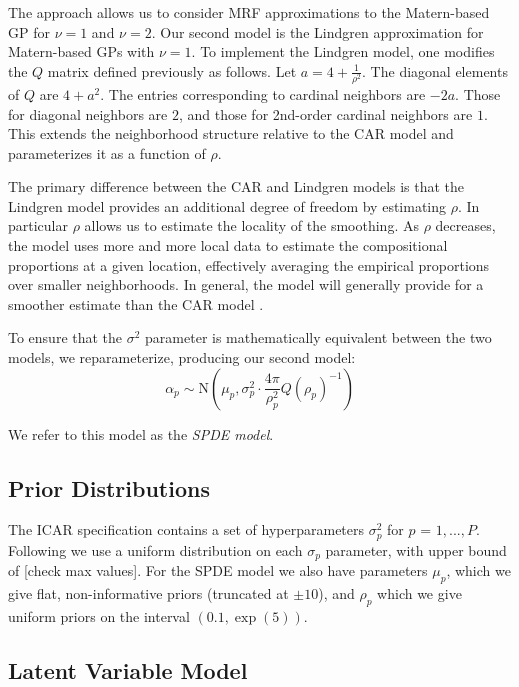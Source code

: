 \documentclass[12pt]{article}\usepackage[]{graphicx}\usepackage[]{color}
\begin{document}
The \citet{Lind:etal:2011} approach allows us to consider MRF approximations
to the Matern-based GP for $\nu=1$ and $\nu=2$. Our second model
is the Lindgren approximation for Matern-based GPs with $\nu=1$.
To implement the Lindgren model, one modifies the $Q$ matrix defined
previously as follows. Let $a=4+\frac{1}{\rho^{2}}$. The diagonal
elements of $Q$ are $4+a^{2}$. The entries corresponding to cardinal
neighbors are $-2a$. Those for diagonal neighbors are $2$, and those
for 2nd-order cardinal neighbors are $1$. This extends the neighborhood
structure relative to the CAR model and parameterizes it as a function
of $\rho$.

The primary difference between the CAR and Lindgren models is that
the Lindgren model provides an additional degree of freedom by estimating
$\rho$. In particular $\rho$ allows us to estimate the locality
of the smoothing. As $\rho$ decreases, the model uses more and more
local data to estimate the compositional proportions at a given location,
effectively averaging the empirical proportions over smaller neighborhoods.
In general, the \cite{Lind:etal:2011} model will generally provide
for a smoother estimate than the CAR model \citep{Paci:2013}. 

To ensure that the $\sigma^{2}$ parameter is mathematically equivalent
between the two models, we reparameterize, producing our second model:
\[
\alpha_{p}\sim\mbox{N}\left(\mu_{p},\sigma_{p}^{2}\cdot\frac{4\pi}{\rho_{p}^{2}}Q(\rho_{p})^{-1}\right)
\]


We refer to this model as the \emph{SPDE model}.


\subsection{Prior Distributions}

\noindent The ICAR specification contains a set of hyperparameters
$\sigma_{p}^{2}$ for $p$ = $1,...,P$. Following \cite{Gelm:2006}
we use a uniform distribution on each $\sigma_{p}$ parameter, with
upper bound of {[}check max values{]}. For the SPDE model we also
have parameters $\mu_{p}$, which we give flat, non-informative priors
(truncated at $\pm10$), and $\rho_{p}$ which we give uniform priors
on the interval $(0.1,\exp(5))$. 


\subsection{Latent Variable Model\label{sub:Latent-Variable-Model}}
\end{document}
